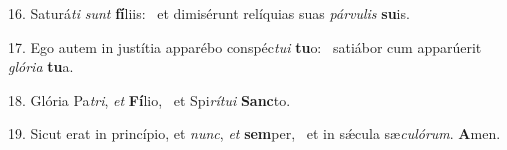 16. Saturá\textit{ti} \textit{sunt} \textbf{fí}liis: \ast\  et dimisérunt relíquias suas \textit{pár}\textit{vu}\textit{lis} \textbf{su}is.\

17. Ego autem in justítia apparébo conspéc\textit{tu}\textit{i} \textbf{tu}o: \ast\  satiábor cum apparúerit \textit{gló}\textit{ri}\textit{a} \textbf{tu}a.\

18. Glória Pa\textit{tri}, \textit{et} \textbf{Fí}lio, \ast\  et Spi\textit{rí}\textit{tu}\textit{i} \textbf{Sanc}to.\

19. Sicut erat in princípio, et \textit{nunc}, \textit{et} \textbf{sem}per, \ast\  et in sǽcula sæ\textit{cu}\textit{ló}\textit{rum}. \textbf{A}men.\

